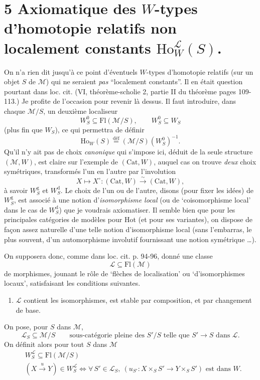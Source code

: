 \documentclass[11pt]{article}
\newcommand{\printedpage}[1]{\marginpar{\footnotesize p.~#1}}
\newcommand{\msp}[1]{\marginpar{\footnotesize [#1]}}
\newcommand{\deff}{\overset{\text{déf}}{=}}
\begin{document}
\printedpage{140}

\section*{5 Axiomatique des $W$-types d'homotopie relatifs non localement constants $\mathrm{Ho}^{\mathcal{L}}_W(S)$.}

On n'a rien dit jusqu'à ce point d'éventuels $W$-types d'homotopie relatifs (sur un objet $S$ de $\mathcal{M}$) qui ne seraient \textit{pas} ``localement constants''. Il en était question pourtant dans loc. cit. (VI, théorème-scholie 2, partie II du théorème pages 109-113.) Je profite de l'occasion pour revenir là dessus. Il faut introduire, dans chaque $\mathcal{M}/S$, un deuxième localiseur
\[
W^0_S \subseteq \mathrm{Fl}(\mathcal{M}/S), \qquad W^0_S \subseteq W_S
\]
(plus fin que $W_S$), ce qui permettra de définir
\msp{page 219}
\[
\mathrm{Ho}_W(S) \deff (\mathcal{M}/S)(W^0_S)^{-1}.
\]
Qu'il n'y ait pas de choix \textit{canonique} qui s'impose ici, déduit de la seule structure $(\mathcal{M},W)$, est claire sur l'exemple de $(\mathrm{Cat},W)$, auquel cas on trouve \textit{deux} choix symétriques, transformés l'un en l'autre par l'involution
\[
X \longmapsto X^\circ : (\mathrm{Cat},W) \xrightarrow{\sim} (\mathrm{Cat},W),
\]
à savoir $W^{\mathrm{g}}_S$ et $W^{\mathrm{d}}_S$. Le choix de l'un ou de l'autre, disons (pour fixer les idées) de $W^{\mathrm{g}}_S$, est associé à une notion d'\textit{isomorphisme local} (ou de `coisomorphisme local' dans le cas de $W^{\mathrm{d}}_S$) que je voudrais axiomatiser. Il semble bien que pour les principales catégories de modèles pour Hot (et pour ses variantes), on dispose de façon assez naturelle d'une telle notion d'isomorphisme local (sans l'embarras, le plus souvent, d'un automorphisme involutif fournissant une notion symétrique \dots).

On supposera donc, comme dans loc. cit. p. 94-96, donné une classe
\[
\mathcal{L} \subseteq \mathrm{Fl}(\mathcal{M})
\]
de morphismes, jounant le rôle de `flèches de %
\msp{page 220}
localisation' ou `d'isomorphismes locaux', satisfaisant les conditions suivantes.

\begin{enumerate}
\item[$(*)$] $\mathcal{L}$ contient les isomorphismes, est stable par composition, et par changement de base.
\end{enumerate}

On pose, pour $S$ dans $\mathcal{M}$,
\[
\mathcal{L}_S \subseteq \mathcal{M}/S \qquad \text{sous-catégorie pleine des } S'/S \text{ telle que } S' \longrightarrow S \text{ dans } \mathcal{L}.
\]
On définit alors pour tout $S$ dans $\mathcal{M}$
\[
\begin{aligned}
&W^{\mathcal{L}}_S \subseteq \mathrm{Fl}(\mathcal{M}/S)\\
&(X \xrightarrow{u} Y) \in W^{\mathcal{L}}_S \iff \forall\, S' \in \mathcal{L}_S,\ (u_{S'} : X \times_S S' \longrightarrow Y \times_S S') \text{ est dans } W.
\end{aligned}
\]
\end{document}
